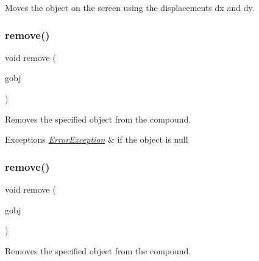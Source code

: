 Moves the object on the screen using the displacements {\ttfamily dx} and {\ttfamily dy}. 

\mbox{\label{classGCompound_a49dc57a2ce4caa354a5fff6acdde2e7d}} 
\subsubsection{\texorpdfstring{remove()}{remove()}\hspace{0.1cm}{\footnotesize\ttfamily [1/2]}}
{\footnotesize\ttfamily void remove (\begin{DoxyParamCaption}\item[{\mbox{\hyperlink{classGObject}{G\+Object}} $\ast$}]{gobj }\end{DoxyParamCaption})\hspace{0.3cm}{\ttfamily [virtual]}}



Removes the specified object from the compound. 


\begin{DoxyExceptions}{Exceptions}
{\em \mbox{\hyperlink{classErrorException}{Error\+Exception}}} & if the object is null \\
\hline
\end{DoxyExceptions}
\mbox{\label{classGCompound_a0c0ae4d69b584602ff3cba0d9cf330a4}} 
\subsubsection{\texorpdfstring{remove()}{remove()}\hspace{0.1cm}{\footnotesize\ttfamily [2/2]}}
{\footnotesize\ttfamily void remove (\begin{DoxyParamCaption}\item[{\mbox{\hyperlink{classGObject}{G\+Object}} \&}]{gobj }\end{DoxyParamCaption})\hspace{0.3cm}{\ttfamily [virtual]}}



Removes the specified object from the compound. 

\mbox{\label{classGCompound_a9b0a5a3ad9972ab0e8eb0b54873aac6b}} 
